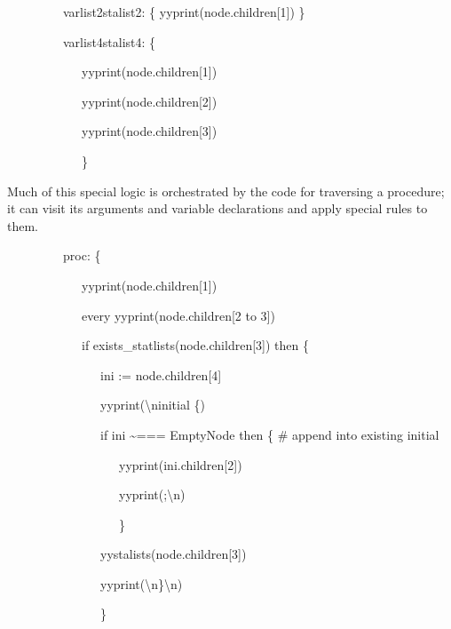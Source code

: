 {\ttfamily\mdseries
\ \ \ \ \ \ \ \ \ {\textquotedbl}varlist2{\textquotedbl}{\textbar}{\textquotedbl}stalist2{\textquotedbl}: \{
yyprint(node.children[1]) \}}

{\ttfamily\mdseries
\ \ \ \ \ \ \ \ \ {\textquotedbl}varlist4{\textquotedbl}{\textbar}{\textquotedbl}stalist4{\textquotedbl}: \{}

{\ttfamily\mdseries
\ \ \ \ \ \ \ \ \ \ \ \ yyprint(node.children[1])}

{\ttfamily\mdseries
\ \ \ \ \ \ \ \ \ \ \ \ yyprint(node.children[2])}

{\ttfamily\mdseries
\ \ \ \ \ \ \ \ \ \ \ \ yyprint(node.children[3])}

{\ttfamily\mdseries
\ \ \ \ \ \ \ \ \ \ \ \ \}}


Much of this special logic is orchestrated by the code for traversing
a procedure; it can visit its arguments and variable declarations and
apply special rules to them.

{\ttfamily\mdseries
\ \ \ \ \ \ \ \ \ {\textquotedbl}proc{\textquotedbl}: \{}

{\ttfamily\mdseries
\ \ \ \ \ \ \ \ \ \ \ \ yyprint(node.children[1])}

{\ttfamily\mdseries
\ \ \ \ \ \ \ \ \ \ \ \ every yyprint(node.children[2 to 3])}

{\ttfamily\mdseries
\ \ \ \ \ \ \ \ \ \ \ \ if exists\_statlists(node.children[3]) then \{}

{\ttfamily\mdseries
\ \ \ \ \ \ \ \ \ \ \ \ \ \ \ ini := node.children[4]}

{\ttfamily\mdseries
\ \ \ \ \ \ \ \ \ \ \ \ \ \ \ yyprint({\textquotedbl}{\textbackslash}ninitial \{{\textquotedbl})}

{\ttfamily\mdseries
\ \ \ \ \ \ \ \ \ \ \ \ \ \ \ if ini \~{}=== EmptyNode then \{ \# append into existing initial}

{\ttfamily\mdseries
\ \ \ \ \ \ \ \ \ \ \ \ \ \ \ \ \ \ yyprint(ini.children[2])}

{\ttfamily\mdseries
\ \ \ \ \ \ \ \ \ \ \ \ \ \ \ \ \ \ yyprint({\textquotedbl};{\textbackslash}n{\textquotedbl})}

{\ttfamily\mdseries
\ \ \ \ \ \ \ \ \ \ \ \ \ \ \ \ \ \ \}}

{\ttfamily\mdseries
\ \ \ \ \ \ \ \ \ \ \ \ \ \ \ yystalists(node.children[3])}

{\ttfamily\mdseries
\ \ \ \ \ \ \ \ \ \ \ \ \ \ \ yyprint({\textquotedbl}{\textbackslash}n\}{\textbackslash}n{\textquotedbl})}

{\ttfamily\mdseries
\ \ \ \ \ \ \ \ \ \ \ \ \ \ \ \}}


